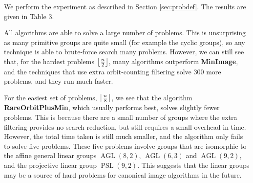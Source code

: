 We perform the experiment as described in Section \ref{sec:probdef}. The results
are given in Table 3.

All algorithms are able to solve a large number of problems. This is unsurprising
as many primitive groups are quite small (for example the cyclic groups), so any
technique is able to brute-force search many problems. However, we can still see that,
for the hardest problems \(\left \lfloor \frac{n}{2} \right \rfloor\), many algorithms
outperform \textbf{MinImage}, and the techniques that use extra orbit-counting
filtering solve 300 more problems, and they run much faster.

For the easiest set of problems, \(\left \lfloor \frac{n}{8} \right \rfloor\), we see that the
algorithm \textbf{RareOrbitPlusMin}, which usually performs best, solves slightly fewer problems. This
is because there are a small number of groups where the extra filtering provides
no search reduction, but still requires a small overhead in time. However, the
total time taken is still much smaller, and the algorithm only fails to solve
five problems. These five problems involve groups that are isomorphic to the
affine general linear groups $\operatorname{AGL}(8,2)$,
$\operatorname{AGL}(6,3)$ and $\operatorname{AGL}(9,2)$, and
the projective linear group $\operatorname{PSL}(9,2)$. This suggests that the linear
groups may be a source of hard problems for canonical image algorithms in the future.

